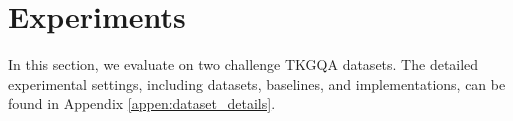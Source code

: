 

\vspace{-2mm}
\section{Experiments}
\label{sec:exp}
In this section, we evaluate \mot on two challenge TKGQA datasets. The detailed experimental settings, including datasets, baselines, and implementations, can be found in Appendix \ref{appen:dataset_details}.



